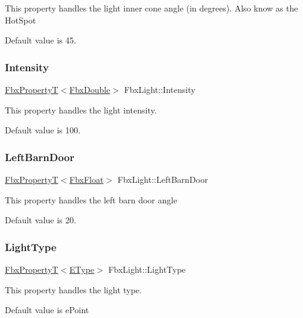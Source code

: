 This property handles the light inner cone angle (in degrees). Also know as the Hot\+Spot

Default value is 45. \mbox{\label{class_fbx_light_a3fc7a2684e3ab3cbd944825afd263433}} 
\subsubsection{\texorpdfstring{Intensity}{Intensity}}
{\footnotesize\ttfamily \hyperlink{class_fbx_property_t}{Fbx\+PropertyT}$<$\hyperlink{fbxtypes_8h_a171e72a1c46fc15c1a6c9c31948c1c5b}{Fbx\+Double}$>$ Fbx\+Light\+::\+Intensity}

This property handles the light intensity.

Default value is 100. \mbox{\label{class_fbx_light_afcf3b7db2cad32e11bb6fa016a402bc7}} 
\subsubsection{\texorpdfstring{Left\+Barn\+Door}{LeftBarnDoor}}
{\footnotesize\ttfamily \hyperlink{class_fbx_property_t}{Fbx\+PropertyT}$<$\hyperlink{fbxtypes_8h_aef968e37f2ddc4188de464d8578c1d5c}{Fbx\+Float}$>$ Fbx\+Light\+::\+Left\+Barn\+Door}

This property handles the left barn door angle

Default value is 20. \mbox{\label{class_fbx_light_a2ce6e644dd2f9d7140c192d27d70ff93}} 
\subsubsection{\texorpdfstring{Light\+Type}{LightType}}
{\footnotesize\ttfamily \hyperlink{class_fbx_property_t}{Fbx\+PropertyT}$<$\hyperlink{class_fbx_light_ace4ba495501bddf1341600bea7ed8daf}{E\+Type}$>$ Fbx\+Light\+::\+Light\+Type}

This property handles the light type.

Default value is e\+Point \mbox{\label{class_fbx_light_adb8b8187ea6c10eca1c82d1a2b769d53}} 
